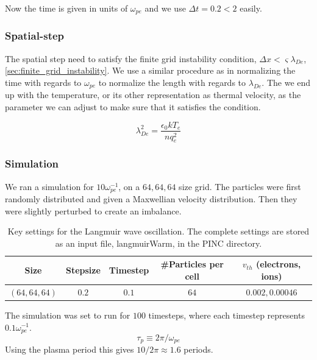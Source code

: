         Now the time is given in units of \(\omega_{pe}\) and we use \(\Delta t = 0.2 < 2\) easily.

        \subsubsection{Spatial-step}
        The spatial step need to satisfy the finite grid instability condition,
        \(\Delta x < \varsigma \lambda_{De}\), \cref{sec:finite_grid_instability}.
        We use a similar procedure as in normalizing the time with regards to \(\omega_{pe}\)
        to normalize the length with regards to \(\lambda_{De}\). The we end up with
        the temperature, or its other representation as thermal velocity, as the parameter we can adjust to make sure that it satisfies the
        condition.

        \begin{equation}
            \lambda_{De}^2 = \frac{\epsilon_0 kT_e}{nq^2_e}
        \end{equation}


		\subsubsection{Simulation}
			We ran a simulation for \(10\omega_{pe}^{-1}\), on a \(64,64,64\) size grid. The particles
			were first randomly distributed and given a Maxwellian velocity distribution.
			Then they were slightly perturbed to create an imbalance.

			\begin{table}
					\center
			\begin{tabular}{c|c|c|c|c}
				Size 			&	Stepsize &	Timestep &\#Particles per cell	& \(v_{th}\) (electrons, ions)
				\\ \hline
				\((64,64,64)\)	& \(0.2\)	& \(0.1\)  	&	\(64\)	& 		\(0.002, 0.00046\)
			\end{tabular}
			\caption{Key settings for the Langmuir wave oscillation. The complete settings are
			stored as an input file, langmuirWarm, in the PINC directory.}
			\end{table}

			The simulation was set to run for \(100\) timesteps, where each timestep represents \(0.1\omega_{pe}^{-1}\).
			\begin{equation}
				\tau_p \equiv 2\pi/\omega_{pe}
			\end{equation}
			Using the plasma period this gives \(10/2\pi\approx 1.6\) periods.

